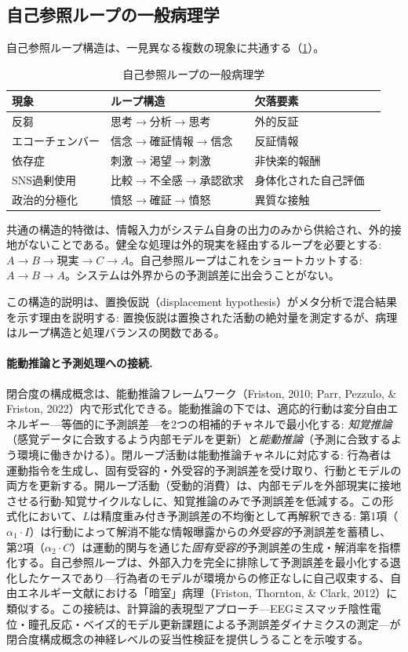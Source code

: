 \documentclass[a4paper,11pt,titlepage]{article}
\begin{document}
\subsection{自己参照ループの一般病理学}\label{sec:self-ref}

自己参照ループ構造は、一見異なる複数の現象に共通する（\cref{tab:self-ref}）。

\begin{table}[htbp]
\centering
\caption{自己参照ループの一般病理学}
\label{tab:self-ref}
\begin{tabular}{llll}
\toprule
現象 & ループ構造 & 欠落要素 \\
\midrule
反芻 & 思考$\to$分析$\to$思考 & 外的反証 \\
エコーチェンバー & 信念$\to$確証情報$\to$信念 & 反証情報 \\
依存症 & 刺激$\to$渇望$\to$刺激 & 非快楽的報酬 \\
SNS過剰使用 & 比較$\to$不全感$\to$承認欲求 & 身体化された自己評価 \\
政治的分極化 & 憤怒$\to$確証$\to$憤怒 & 異質な接触 \\
\bottomrule
\end{tabular}
\end{table}

共通の構造的特徴は、情報入力がシステム自身の出力のみから供給され、外的接地がないことである。健全な処理は外的現実を経由するループを必要とする: $A \to B \to \text{現実} \to C \to A$。自己参照ループはこれをショートカットする: $A \to B \to A$。システムは外界からの予測誤差に出会うことがない。

この構造的説明は、置換仮説（displacement hypothesis）がメタ分析で混合結果を示す理由を説明する: 置換仮説は置換された活動の絶対量を測定するが、病理はループ構造と処理バランスの関数である。

\paragraph{能動推論と予測処理への接続.}
閉合度の構成概念は、能動推論フレームワーク（Friston, 2010; Parr, Pezzulo, \& Friston, 2022）内で形式化できる。能動推論の下では、適応的行動は変分自由エネルギー---等価的に予測誤差---を2つの相補的チャネルで最小化する: \textit{知覚推論}（感覚データに合致するよう内部モデルを更新）と\textit{能動推論}（予測に合致するよう環境に働きかける）。閉ループ活動は能動推論チャネルに対応する: 行為者は運動指令を生成し、固有受容的・外受容的予測誤差を受け取り、行動とモデルの両方を更新する。開ループ活動（受動的消費）は、内部モデルを外部現実に接地させる行動-知覚サイクルなしに、知覚推論のみで予測誤差を低減する。この形式化において、$L$は精度重み付き予測誤差の不均衡として再解釈できる: 第1項（$\alpha_1 \cdot I$）は行動によって解消不能な情報曝露からの\textit{外受容的}予測誤差を蓄積し、第2項（$\alpha_2 \cdot C$）は運動的関与を通じた\textit{固有受容的}予測誤差の生成・解消率を指標化する。自己参照ループは、外部入力を完全に排除して予測誤差を最小化する退化したケースであり---行為者のモデルが環境からの修正なしに自己収束する、自由エネルギー文献における「暗室」病理（Friston, Thornton, \& Clark, 2012）に類似する。この接続は、計算論的表現型アプローチ---EEGミスマッチ陰性電位・瞳孔反応・ベイズ的モデル更新課題による予測誤差ダイナミクスの測定---が閉合度構成概念の神経レベルの妥当性検証を提供しうることを示唆する。
\end{document}
